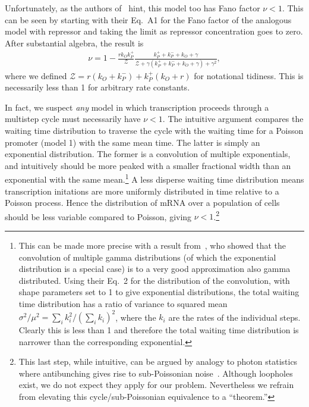 Unfortunately, as the authors of~\cite{Mitarai2015} hint, this model too has
Fano factor $\nu<1$. This can be seen by starting with their Eq.~A1 for the Fano
factor of the analogous model with repressor and taking the limit as repressor
concentration goes to zero. After substantial algebra, the result is
\begin{align}
\nu = 1 - \frac{r k_O k_P^+}{\mathcal{Z}}
\frac{k_P^+ + k_P^- + k_O + \gamma}
        {\mathcal{Z} + \gamma(k_P^+ + k_P^- + k_O + \gamma) + \gamma^2},
\end{align}
where we defined $\mathcal{Z} = r(k_O + k_P^-) + k_P^+(k_O + r)$ for notational
tidiness. This is necessarily less than 1 for arbitrary rate constants.

In fact, we suspect \textit{any} model in which transcription proceeds through a
multistep cycle must necessarily have $\nu<1$. The intuitive argument compares
the waiting time distribution to traverse the cycle with the waiting time for a
Poisson promoter (model 1) with the same mean time. The latter is simply an
exponential distribution. The former is a convolution of multiple exponentials,
and intuitively should be more peaked with a smaller fractional width than an
exponential with the same mean.\footnote{This can be made more precise with a
result from~\cite{Stewart2007}, who showed that the convolution of multiple
gamma distributions (of which the exponential distribution is a special case) is
to a very good approximation also gamma distributed. Using their Eq.~2 for the
distribution of the convolution, with shape parameters set to 1 to give
exponential distributions, the total waiting time distribution has a ratio of
variance to squared mean $\sigma^2/\mu^2 = \sum_i k_i^2/\left(\sum_i
k_i\right)^2$, where the $k_i$ are the rates of the individual steps. Clearly
this is less than 1 and therefore the total waiting time distribution is
narrower than the corresponding exponential.} A less disperse waiting time
distribution means transcription initations are more uniformly distributed in
time relative to a Poisson process. Hence the distribution of mRNA over a
population of cells should be less variable compared to Poisson, giving
$\nu<1$.\footnote{This last step, while intuitive, can be argued by analogy to
photon statistics where antibunching gives rise to sub-Poissonian
noise~\cite{Paul1982, Zou1990}. Although loopholes exist, we do not expect they
apply for our problem. Nevertheless we refrain from elevating this
cycle/sub-Poissonian equivalence to a ``theorem.'' }

